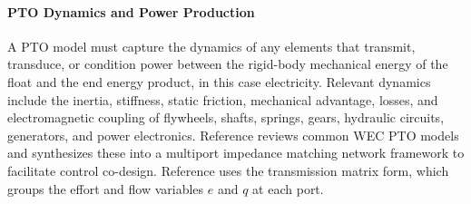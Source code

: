 \paragraph{PTO Dynamics and Power Production}
A PTO model must capture the dynamics of any elements that transmit, transduce, or condition power between the rigid-body mechanical energy of the float and the end energy product, in this case electricity.
Relevant dynamics include the inertia, stiffness, static friction, mechanical advantage, losses, and electromagnetic coupling of flywheels, shafts, springs, gears, hydraulic circuits, generators, and power electronics.
Reference \cite{penalba_review_2016} reviews common WEC PTO models and \cite{coe_co-design_2024} synthesizes these into a multiport impedance matching network framework to facilitate control co-design.
Reference \cite{coe_co-design_2024} uses the transmission matrix form, which groups the effort and flow variables $e$ and $q$ at each port. 

